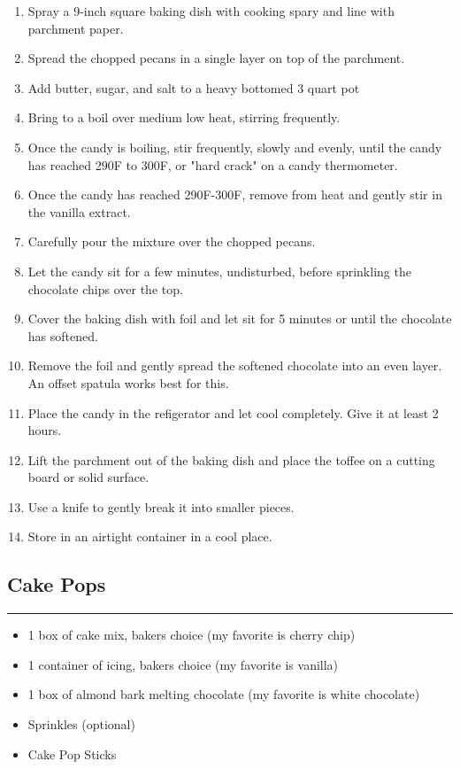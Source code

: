 \documentclass{article}
\begin{document}
\begin{enumerate}
    \item 
        Spray a 9-inch square baking dish with cooking spary and line with parchment paper.
    \item 
        Spread the chopped pecans in a single layer on top of the parchment.
    \item 
        Add butter, sugar, and salt to a heavy bottomed 3 quart pot
    \item 
        Bring to a boil over medium low heat, stirring frequently.
    \item 
        Once the candy is boiling, stir frequently, slowly and evenly, until the candy has reached 290F to 300F, or "hard crack" on a candy thermometer.
    \item
        Once the candy has reached 290F-300F, remove from heat and gently stir in the vanilla extract.
    \item 
        Carefully pour the mixture over the chopped pecans.
    \item 
        Let the candy sit for a few minutes, undisturbed, before sprinkling the chocolate chips over the top.
    \item 
        Cover the baking dish with foil and let sit for 5 minutes or until the chocolate has softened.
    \item 
        Remove the foil and gently spread the softened chocolate into an even layer. An offset spatula works best for this.
    \item
        Place the candy in the refigerator and let cool completely. Give it at least 2 hours.
    \item 
        Lift the parchment out of the baking dish and place the toffee on a cutting board or solid surface.
    \item 
        Use a knife to gently break it into smaller pieces.
    \item 
        Store in an airtight container in a cool place.
\end{enumerate}
\newpage

\subsection{Cake Pops} 
\noindent\rule[0.5ex]{\linewidth}{1pt}

\begin{framed}
\begin{itemize}
    \item
        1 box of cake mix, bakers choice (my favorite is cherry chip)
    \item 
        1 container of icing, bakers choice (my favorite is vanilla)
    \item 
        1 box of almond bark melting chocolate (my favorite is white chocolate)
    \item 
        Sprinkles (optional)
    \item 
        Cake Pop Sticks
\end{itemize}
\end{framed}
\end{document}
